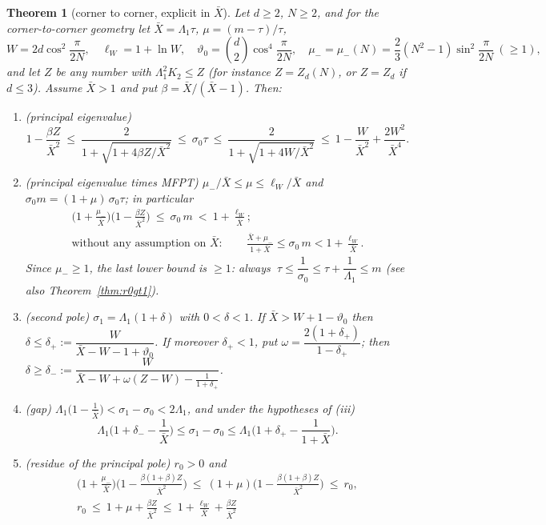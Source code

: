\documentclass[11pt,a4paper]{article}
\newcommand{\Xb}{\bar X}
\theoremstyle{plain}
\newtheorem{theorem}{Theorem}[section]
\theoremstyle{definition}
\numberwithin{equation}{section}
\begin{document}
\begin{theorem}[corner to corner, explicit in $\Xb$]\label{thm:cc}
Let $d\ge2$, $N\ge2$, and for the corner-to-corner geometry let $\Xb=\Lambda_1\tau$, $\mu=(m-\tau)/\tau$,
\[
W=2d\cos^2\frac{\pi}{2N},\quad \ell_W=1+\ln W,\quad\vartheta_0=\binom d2\cos^4\frac\pi{2N},\quad\mu_-=\mu_-(N)=\frac23(N^2-1)\sin^2\frac{\pi}{2N}\ (\ge1),
\]
and let $Z$ be any number with $\Lambda_1^2K_2\le Z$ (for instance $Z=Z_d(N)$, or $Z=Z_d$ if $d\le3$). Assume $\Xb>1$ and put $\beta=\Xb/(\Xb-1)$. Then:
\begin{enumerate}
\item[(i)] \emph{(principal eigenvalue)}
\[
1-\frac{\beta Z}{\Xb^2}\ \le\ \frac{2}{1+\sqrt{1+4\beta Z/\Xb^2}}\ \le\ \sigma_0\tau\ \le\ \frac{2}{1+\sqrt{1+4W/\Xb^2}}\ \le\ 1-\frac{W}{\Xb^2}+\frac{2W^2}{\Xb^4}.
\]
\item[(ii)] \emph{(principal eigenvalue times MFPT)} $\mu_-/\Xb\le\mu\le\ell_W/\Xb$ and $\sigma_0m=(1+\mu)\,\sigma_0\tau$; in particular
\begin{gather*}
\Big(1+\frac{\mu_-}{\Xb}\Big)\Big(1-\frac{\beta Z}{\Xb^2}\Big)\ \le\ \sigma_0\,m\ <\ 1+\frac{\ell_W}{\Xb};\\
\text{without any assumption on }\Xb:\qquad \frac{\Xb+\mu_-}{1+\Xb}\le\sigma_0\,m<1+\frac{\ell_W}{\Xb}.
\end{gather*}
Since $\mu_-\ge1$, the last lower bound is $\ge1$: \emph{always} $\ \tau\le\dfrac1{\sigma_0}\le\tau+\dfrac1{\Lambda_1}\le m$ (see also Theorem~\ref{thm:r0gt1}).
\item[(iii)] \emph{(second pole)} $\sigma_1=\Lambda_1(1+\delta)$ with $0<\delta<1$. If $\Xb>W+1-\vartheta_0$ then
$\delta\le\delta_+:=\dfrac{W}{\Xb-W-1+\vartheta_0}$. If moreover $\delta_+<1$, put $\omega=\dfrac{2(1+\delta_+)}{1-\delta_+}$; then
$\delta\ge\delta_-:=\dfrac{W}{\Xb-W+\omega(Z-W)-\frac1{1+\delta_+}}$.
\item[(iv)] \emph{(gap)} $\Lambda_1\big(1-\frac1{\Xb}\big)<\sigma_1-\sigma_0<2\Lambda_1$, and under the hypotheses of (iii)
\[
\Lambda_1\Big(1+\delta_--\frac1{\Xb}\Big)\le\sigma_1-\sigma_0\le\Lambda_1\Big(1+\delta_+-\frac{1}{1+\Xb}\Big).
\]
\item[(v)] \emph{(residue of the principal pole)} $r_0>0$ and
\begin{gather*}
\Big(1+\frac{\mu_-}{\Xb}\Big)\Big(1-\frac{\beta(1+\beta)Z}{\Xb^2}\Big)\ \le\ (1+\mu)\Big(1-\frac{\beta(1+\beta)Z}{\Xb^2}\Big)\ \le\ r_0,\\
r_0\ \le\ 1+\mu+\frac{\beta Z}{\Xb^2}\ \le\ 1+\frac{\ell_W}{\Xb}+\frac{\beta Z}{\Xb^2}
\end{gather*}

\end{enumerate}
\end{theorem}
\end{document}
